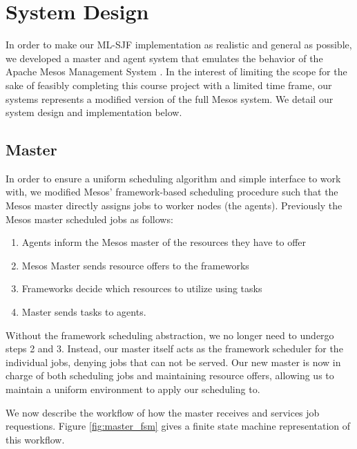 \documentclass{hotnets19}
\begin{document}

\section{System Design}

In order to make our ML-SJF implementation as realistic and general as possible, we developed a master and agent system that emulates the behavior of the Apache Mesos Management System \cite{hindman2011mesos}. In the interest of limiting the scope for the sake of feasibly completing this course project with a limited time frame, our systems represents a modified version of the full Mesos system. We detail our system design and implementation below. 

\subsection{Master}
In order to ensure a uniform scheduling algorithm and simple interface to work with, we modified Mesos' framework-based scheduling procedure such that the Mesos master directly assigns jobs to worker nodes (the agents). 
Previously the Mesos master scheduled jobs as follows:
\begin{enumerate}
	\item Agents inform the Mesos master of the resources they have to offer
	\item Mesos Master sends resource offers to the frameworks
	\item Frameworks decide which resources to utilize using tasks
	\item Master sends tasks to agents.
\end{enumerate}
Without the framework scheduling abstraction, we no longer need to undergo steps 2 and 3. Instead, our master itself acts as the framework scheduler for the individual jobs, denying jobs that can not be served. Our new master is now in charge of both scheduling jobs and maintaining resource offers, allowing us to maintain a uniform environment to apply our scheduling to.

We now describe the workflow of how the master receives and services job requestions. Figure \ref{fig:master_fsm} gives a finite state machine representation of this workflow.
\end{document}
